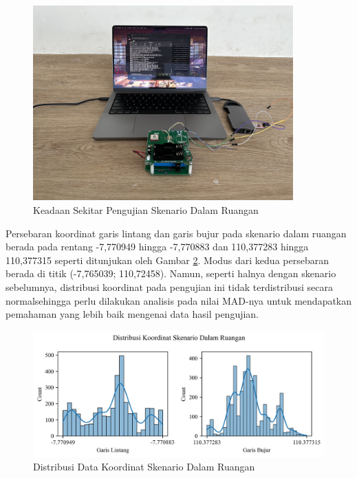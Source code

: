 \begin{figure}[H]
	\centering
	\includegraphics[width=10cm]{contents/chapter-4/2-skenario-indoor/keadaan.jpg}
	\caption{Keadaan Sekitar Pengujian Skenario Dalam Ruangan}
	\label{Fig: indoor-keadaan}
\end{figure}

Persebaran koordinat garis lintang dan garis bujur pada skenario dalam ruangan berada pada rentang -7,770949 hingga -7,770883 dan 110,377283 hingga 110,377315 seperti ditunjukan oleh Gambar \ref{Fig:indoor-distribution}. Modus dari kedua persebaran berada di titik (-7,765039; 110,72458). Namun, seperti halnya dengan skenario sebelumnya, distribusi koordinat pada pengujian ini tidak terdistribusi secara normalsehingga perlu dilakukan analisis pada nilai MAD-nya untuk mendapatkan pemahaman yang lebih baik mengenai data hasil pengujian.

\begin{figure}[H]
	\centering
	\begin{adjustbox}{width=\textwidth}
		\includegraphics{contents/chapter-4/2-skenario-indoor/distribution.png}
	\end{adjustbox}
	\caption{Distribusi Data Koordinat Skenario Dalam Ruangan}
	\label{Fig:indoor-distribution}
\end{figure}

